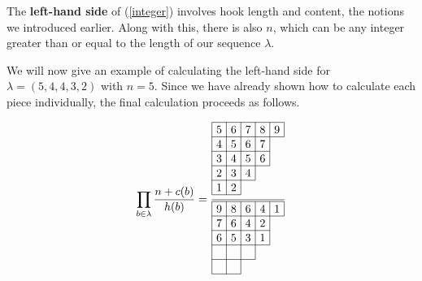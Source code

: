 \documentclass[a4paper,11pt]{amsart}
\begin{document}
The \textbf{left-hand side} of (\ref{integer}) involves hook length and content, the notions we introduced earlier. Along with this, there is also $n$, which can be any integer greater than or equal to the length of our sequence $\lambda$.\par

We will now give an example of calculating the left-hand side for $\lambda=(5,4,4,3,2)$ with $n=5$. Since we have already shown how to calculate each piece individually, the final calculation proceeds as follows.

\begin{equation}
		\prod_{b\in\lambda}\dfrac{n+c(b)}{h(b)}=%
		\dfrac{%
			\begin{tikzpicture}[yscale=-0.45, xscale=0.45]
				\draw (0,0) -- (5,0);
				\draw (0,1) -- (5,1);
				\draw (0,2) -- (4,2);
				\draw (0,3) -- (4,3);
				\draw (0,4) -- (3,4);
				\draw (0,5) -- (2,5);
				\draw (0,0) -- (0,5);
				\draw (1,0) -- (1,5);
				\draw (2,0) -- (2,5);
				\draw (3,0) -- (3,4);
				\draw (4,0) -- (4,3);
				\draw (5,0) -- (5,1);
				\node at (0.5,0.5) {5};
				\node at (1.5,0.5) {6};
				\node at (2.5,0.5) {7};
				\node at (3.5,0.5) {8};
				\node at (4.5,0.5) {9};
				\node at (0.5,1.5) {4};
				\node at (1.5,1.5) {5};
				\node at (2.5,1.5) {6};
				\node at (3.5,1.5) {7};
				\node at (0.5,2.5) {3};
				\node at (1.5,2.5) {4};
				\node at (2.5,2.5) {5};
				\node at (3.5,2.5) {6};
				\node at (0.5,3.5) {2};
				\node at (1.5,3.5) {3};
				\node at (2.5,3.5) {4};
				\node at (0.5,4.5) {1};
				\node at (1.5,4.5) {2};
			\end{tikzpicture}\hfill
		}
		{%
			\begin{tikzpicture}[yscale=-0.45, xscale=0.45]
				\draw (0,0) -- (5,0);
				\draw (0,1) -- (5,1);
				\draw (0,2) -- (4,2);
				\draw (0,3) -- (4,3);
				\draw (0,4) -- (3,4);
				\draw (0,5) -- (2,5);
				\draw (0,0) -- (0,5);
				\draw (1,0) -- (1,5);
				\draw (2,0) -- (2,5);
				\draw (3,0) -- (3,4);
				\draw (4,0) -- (4,3);
				\draw (5,0) -- (5,1);
				\node at (0.5,0.5) {9};
				\node at (1.5,0.5) {8};
				\node at (2.5,0.5) {6};
				\node at (3.5,0.5) {4};
				\node at (4.5,0.5) {1};
				\node at (0.5,1.5) {7};
				\node at (1.5,1.5) {6};
				\node at (2.5,1.5) {4};
				\node at (3.5,1.5) {2};
				\node at (0.5,2.5) {6};
				\node at (1.5,2.5) {5};
				\node at (2.5,2.5) {3};
				\node at (3.5,2.5) {1};

\end{tikzpicture}}
\end{equation}
\end{document}
